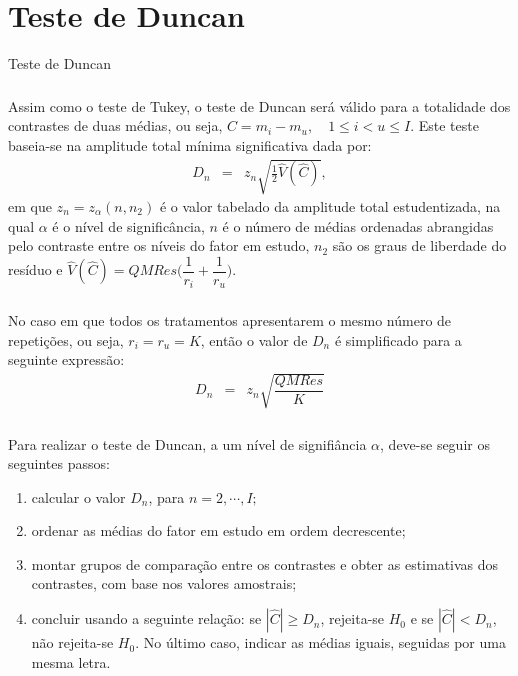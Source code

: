 \documentclass[14pt,aspectratio=1610]{beamer}
\begin{document}
\section{Teste de Duncan}
\begin{frame}{Teste de Duncan}
\frametitle{}
\vspace{-0.3cm}
\begin{block}{}
\justifying
Assim como o teste de Tukey, o teste de Duncan será válido para a totalidade dos contrastes de duas médias, ou seja, $C = m_i - m_u,\quad 1\leq i<u\leq I$. Este 
teste baseia-se na amplitude total mínima significativa dada por:
\vspace{-0.2cm}
\begin{eqnarray*}
  D_n &=& z_n\sqrt{\frac{1}{2}\hat{V}(\hat{C})},
\end{eqnarray*}
\vspace{-0.2cm}
em que $z_n = z_{\alpha}(n, n_2)$ é o valor tabelado da amplitude total estudentizada, na qual $\alpha$ é o nível de significância, $n$ é o número de médias ordenadas 
abrangidas pelo contraste entre os níveis do fator em estudo, $n_2$ são os graus de liberdade do resíduo e 
$\hat{V}(\hat{C}) = QMRes \bigg(\dfrac{1}{r_i} + \dfrac{1}{r_u}\bigg)$.
\end{block}
\end{frame}

\begin{frame}{}
\frametitle{}
\begin{block}{}
\justifying
No caso em que todos os tratamentos apresentarem o mesmo número de repetições, ou seja, $r_i = r_u = K$, então o valor de $D_n$ é simplificado para a seguinte 
expressão:
\begin{eqnarray*}
  D_n &=& z_n \sqrt{\dfrac{QMRes}{K}}
\end{eqnarray*}

\end{block}
\end{frame}

\begin{frame}{}
\frametitle{}
\begin{block}{}
\justifying
Para realizar o teste de Duncan, a um nível de signifiância $\alpha$, deve-se 
seguir os seguintes passos:
\begin{enumerate}
  \item calcular o valor $D_n$, para $n=2,\cdots, I;$\pause
  \item ordenar as médias do fator em estudo em ordem decrescente;\pause
  \item montar grupos de comparação entre os contrastes e obter as estimativas dos
  contrastes, com base nos valores amostrais;\pause
  \item concluir usando a seguinte relação: se $|\hat{C}| \geq D_n$, rejeita-se 
  $H_0$ e se $|\hat{C}| < D_n$, não rejeita-se $H_0$. No último caso, indicar as
  médias iguais, seguidas por uma mesma letra.
\end{enumerate}
\end{block}
\end{frame}
\end{document}
